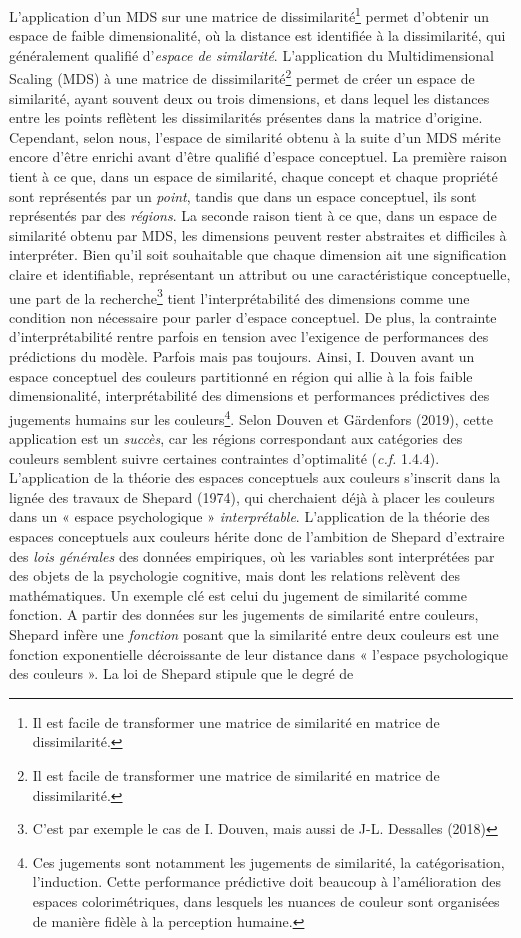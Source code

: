 \documentclass{article}
\begin{document}
L'application d'un MDS sur une matrice de dissimilarité\footnote{Il est facile de transformer une matrice de similarité en matrice de dissimilarité.} permet d'obtenir un espace de faible dimensionalité, où la distance est identifiée à la dissimilarité, qui généralement qualifié d'\textit{espace de similarité}.
L'application du Multidimensional Scaling (MDS) à une matrice de dissimilarité\footnote{Il est facile de transformer une matrice de similarité en matrice de dissimilarité.} permet de créer un espace de similarité, ayant souvent deux ou trois dimensions, et dans lequel les distances entre les points reflètent les dissimilarités présentes dans la matrice d'origine. Cependant, selon nous, l'espace de similarité obtenu à la suite d'un MDS mérite encore d'être enrichi avant d'être qualifié d'espace conceptuel. La première raison tient à ce que, dans un espace de similarité, chaque concept et chaque propriété sont représentés par un \textit{point}, tandis que dans un espace conceptuel, ils sont représentés par des \textit{régions}. La seconde raison tient à ce que, dans un espace de similarité obtenu par MDS, les dimensions peuvent rester abstraites et difficiles à interpréter. Bien qu'il soit souhaitable que chaque dimension ait une signification claire et identifiable, représentant un attribut ou une caractéristique conceptuelle, une part de la recherche\footnote{C'est par exemple le cas de I. Douven, mais aussi de J-L. Dessalles (2018)} tient l'interprétabilité des dimensions comme une condition non nécessaire pour parler d'espace conceptuel. De plus, la contrainte d’interprétabilité rentre parfois en tension avec l’exigence de performances des prédictions du modèle. Parfois mais pas toujours. Ainsi, I. Douven avant un espace conceptuel des couleurs partitionné en région qui allie à la fois faible dimensionalité, interprétabilité des dimensions et performances prédictives des jugements humains sur les couleurs\footnote{Ces jugements sont notamment les jugements de similarité, la catégorisation, l'induction. Cette performance prédictive doit beaucoup à l’amélioration des espaces colorimétriques, dans lesquels les nuances de couleur sont organisées de manière fidèle à la perception humaine.}. Selon Douven et Gärdenfors (2019), cette application est un \textit{succès}, car les régions correspondant aux catégories des couleurs semblent suivre certaines contraintes d’optimalité (\textit{c.f.} 1.4.4). L’application de la théorie des espaces conceptuels aux couleurs s'inscrit dans la lignée des travaux de Shepard (1974), qui cherchaient déjà à placer les couleurs dans un « espace psychologique » \textit{interprétable}. L’application de la théorie des espaces conceptuels aux couleurs hérite donc de l'ambition de Shepard d’extraire des \textit{lois générales} des données empiriques, où les variables sont interprétées par des objets de la psychologie cognitive, mais dont les relations relèvent des mathématiques. Un exemple clé est celui du jugement de similarité comme fonction. A partir des données sur les jugements de similarité entre couleurs, Shepard infère une \textit{fonction} posant que la similarité entre deux couleurs est une fonction exponentielle décroissante de leur distance dans « l’espace psychologique des couleurs ». La loi de Shepard stipule que le degré de 
\end{document}
